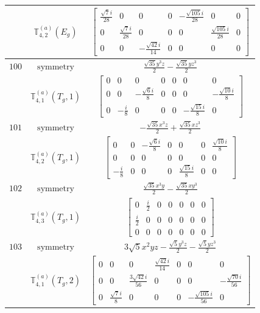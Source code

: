 \documentclass[fleqn,8pt,landscape]{jsarticle}
\begin{document}
\begin{longtable}{ccc}
$  $ & $ \mathbb{T}_{4,2}^{(a)}(E_{g}) $ & $ \begin{bmatrix} \frac{\sqrt{7} i}{28} & 0 & 0 & 0 & - \frac{\sqrt{105} i}{28} & 0 & 0 \\ 0 & \frac{\sqrt{7} i}{28} & 0 & 0 & 0 & \frac{\sqrt{105} i}{28} & 0 \\ 0 & 0 & - \frac{\sqrt{42} i}{14} & 0 & 0 & 0 & 0 \end{bmatrix} $ \\ \hline
$ 100 $ & $ \text{symmetry} $ & $ \frac{\sqrt{35} y^{3} z}{2} - \frac{\sqrt{35} y z^{3}}{2} $ \\
$  $ & $ \mathbb{T}_{4,1}^{(a)}(T_{g},1) $ & $ \begin{bmatrix} 0 & 0 & 0 & 0 & 0 & 0 & 0 \\ 0 & 0 & - \frac{\sqrt{6} i}{8} & 0 & 0 & 0 & - \frac{\sqrt{10} i}{8} \\ 0 & - \frac{i}{8} & 0 & 0 & 0 & - \frac{\sqrt{15} i}{8} & 0 \end{bmatrix} $ \\ \hline
$ 101 $ & $ \text{symmetry} $ & $ - \frac{\sqrt{35} x^{3} z}{2} + \frac{\sqrt{35} x z^{3}}{2} $ \\
$  $ & $ \mathbb{T}_{4,2}^{(a)}(T_{g},1) $ & $ \begin{bmatrix} 0 & 0 & - \frac{\sqrt{6} i}{8} & 0 & 0 & 0 & \frac{\sqrt{10} i}{8} \\ 0 & 0 & 0 & 0 & 0 & 0 & 0 \\ - \frac{i}{8} & 0 & 0 & 0 & \frac{\sqrt{15} i}{8} & 0 & 0 \end{bmatrix} $ \\ \hline
$ 102 $ & $ \text{symmetry} $ & $ \frac{\sqrt{35} x^{3} y}{2} - \frac{\sqrt{35} x y^{3}}{2} $ \\
$  $ & $ \mathbb{T}_{4,3}^{(a)}(T_{g},1) $ & $ \begin{bmatrix} 0 & \frac{i}{2} & 0 & 0 & 0 & 0 & 0 \\ \frac{i}{2} & 0 & 0 & 0 & 0 & 0 & 0 \\ 0 & 0 & 0 & 0 & 0 & 0 & 0 \end{bmatrix} $ \\ \hline
$ 103 $ & $ \text{symmetry} $ & $ 3 \sqrt{5} x^{2} y z - \frac{\sqrt{5} y^{3} z}{2} - \frac{\sqrt{5} y z^{3}}{2} $ \\
$  $ & $ \mathbb{T}_{4,1}^{(a)}(T_{g},2) $ & $ \begin{bmatrix} 0 & 0 & 0 & \frac{\sqrt{42} i}{14} & 0 & 0 & 0 \\ 0 & 0 & \frac{3 \sqrt{42} i}{56} & 0 & 0 & 0 & - \frac{\sqrt{70} i}{56} \\ 0 & \frac{\sqrt{7} i}{8} & 0 & 0 & 0 & - \frac{\sqrt{105} i}{56} & 0 \end{bmatrix} $ \\ \hline

\end{longtable}
\end{document}

